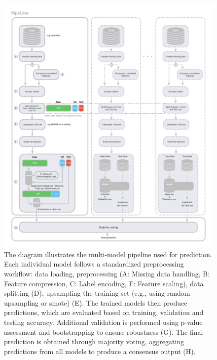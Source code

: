 \documentclass[12pt,a4paper]{report}
\begin{document}
\begin{figure}[H]
  \centering
  \hspace*{-0.9cm}
  \includegraphics[width=1.1\textwidth]{images/Pipeline-1.png}
  \caption[Consensus model pipeline diagram]{The diagram illustrates the multi-model pipeline used for prediction. Each individual model follows a standardized preprocessing workflow: data loading, preprocessing (A: Missing data handling, B: Feature compression, C: Label encoding, F: Feature scaling), data splitting (D), upsampling the training set (e.g., using random upsampling or \acrshort{smote}) (E). The trained models then produce predictions, which are evaluated based on training, validation and testing accuracy. Additional validation is performed using p-value assessment and bootstrapping to ensure robustness (G). The final prediction is obtained through majority voting, aggregating predictions from all models to produce a consensus output (H).}
  \label{fig:pipeline-1}
\end{figure}
\end{document}
